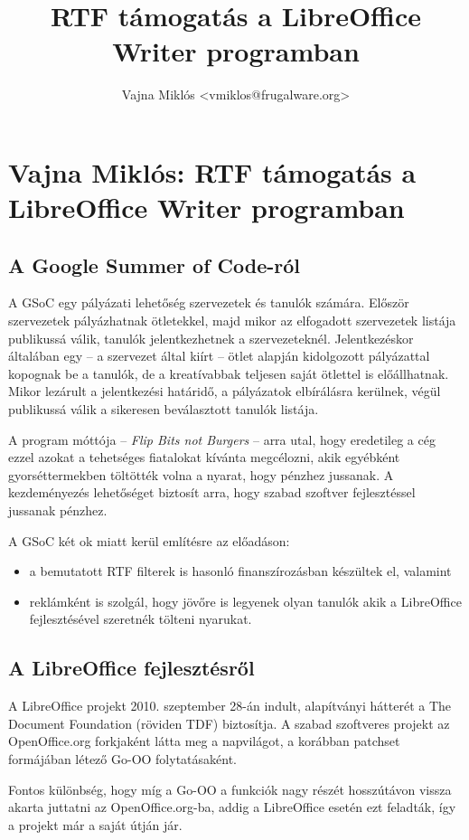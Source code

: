 \documentclass[a4paper]{report}
\title{RTF támogatás a LibreOffice Writer programban}
\author{Vajna Miklós <vmiklos@frugalware.org>}
\begin{document}
\tableofcontents

\chapter{Vajna Miklós: RTF támogatás a LibreOffice Writer programban}

\section{A Google Summer of Code-ról}

A GSoC egy pályázati lehetőség szervezetek és tanulók számára.  Először
szervezetek pályázhatnak ötletekkel, majd mikor az elfogadott szervezetek
listája publikussá válik, tanulók jelentkezhetnek a szervezeteknél.
Jelentkezéskor általában egy -- a szervezet által kiírt -- ötlet alapján
kidolgozott pályázattal kopognak be a tanulók, de a kreatívabbak teljesen saját
ötlettel is előállhatnak. Mikor lezárult a jelentkezési határidő, a pályázatok
elbírálásra kerülnek, végül publikussá válik a sikeresen beválasztott tanulók
listája.

A program móttója -- \emph{Flip Bits not Burgers} -- arra utal, hogy eredetileg
a cég ezzel azokat a tehetséges fiatalokat kívánta megcélozni, akik egyébként
gyorséttermekben töltötték volna a nyarat, hogy pénzhez jussanak. A
kezdeményezés lehetőséget biztosít arra, hogy szabad szoftver fejlesztéssel
jussanak pénzhez.

A GSoC két ok miatt kerül említésre az előadáson:

\begin{itemize}
\item a bemutatott RTF filterek is hasonló finanszírozásban készültek el,
valamint
\item reklámként is szolgál, hogy jövőre is legyenek olyan tanulók akik a
LibreOffice fejlesztésével szeretnék tölteni nyarukat.
\end{itemize}

\section{A LibreOffice fejlesztésről}

A LibreOffice projekt 2010. szeptember 28-án indult, alapítványi hátterét a The
Document Foundation (röviden TDF) biztosítja. A szabad szoftveres projekt az
OpenOffice.org forkjaként látta meg a napvilágot, a korábban patchset
formájában létező Go-OO folytatásaként.

Fontos különbség, hogy míg a Go-OO a funkciók nagy részét hosszútávon vissza
akarta juttatni az OpenOffice.org-ba, addig a LibreOffice esetén ezt feladták,
így a projekt már a saját útján jár.
\end{document}
